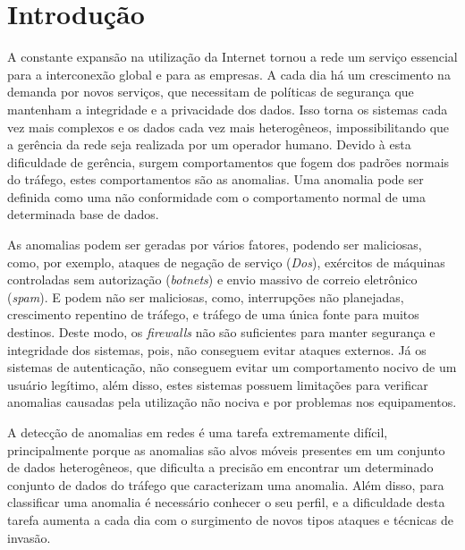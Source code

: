 \documentclass[12pt,openright,oneside,a4paper,english,spanish,brazil]{unifil}
\begin{document}
  \setlength{\absparindent}{0pt}
  \setlength{\absparsep}{18pt}


\textual

\renewcommand{\ABNTEXchapterfont}{\fontfamily{cmr}\fontseries{b}\selectfont}
\renewcommand{\ABNTEXchapterfontsize}{\Large}

\renewcommand{\ABNTEXsectionfont}{\uppercase{\fontfamily{cmr}\fontseries{b}\selectfont}}
\renewcommand{\ABNTEXsectionfontsize}{\large}

\chapter{Introdução}%
\indent A constante expansão na utilização da Internet tornou a rede um serviço essencial para a interconexão global e para as empresas. A cada dia há um crescimento na demanda por  novos serviços, que necessitam de políticas de segurança que mantenham a integridade e a privacidade dos dados. Isso torna os sistemas cada vez mais complexos e os dados cada vez mais heterogêneos, impossibilitando que a gerência da rede seja realizada por um operador humano. Devido à esta dificuldade de gerência, surgem comportamentos que fogem dos padrões normais do tráfego, estes comportamentos são as anomalias. Uma anomalia pode ser definida como uma não conformidade com o comportamento normal de uma determinada base de dados.

\indent As anomalias podem ser geradas por vários fatores, podendo ser maliciosas, como, por exemplo, ataques de negação de serviço (\textit{Dos}), exércitos de máquinas controladas sem autorização (\textit{botnets}) e envio massivo de correio eletrônico (\textit{spam}). E podem não ser maliciosas, como, interrupções não planejadas, crescimento repentino de tráfego, e tráfego de uma única fonte para muitos destinos. Deste modo, os \textit{firewalls} não são suficientes para manter segurança e integridade dos sistemas, pois, não conseguem evitar ataques externos. Já os sistemas de autenticação, não conseguem evitar um comportamento nocivo de um usuário legítimo, além disso, estes sistemas possuem limitações para verificar anomalias causadas pela utilização não nociva e por problemas nos equipamentos.

\indent A detecção de anomalias em redes é uma tarefa extremamente difícil, principalmente porque as anomalias são alvos móveis presentes em um conjunto de dados heterogêneos, que dificulta a precisão em encontrar um determinado conjunto de dados do tráfego que caracterizam uma anomalia. Além disso, para classificar uma anomalia é necessário conhecer o seu perfil, e a dificuldade desta tarefa aumenta a cada dia com o surgimento de novos tipos ataques e técnicas de invasão.
\end{document}
